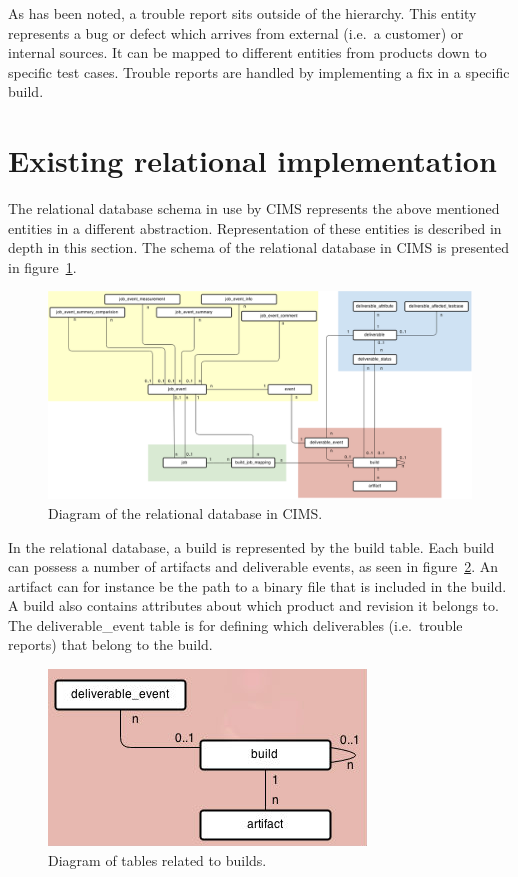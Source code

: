 As has been noted, a trouble report sits outside of the hierarchy. This entity represents a bug or defect which arrives from external (i.e.\ a customer) or internal sources. It can be mapped to different entities from products down to specific test cases. Trouble reports are handled by implementing a fix in a specific build.

\section{Existing relational implementation}
The relational database schema in use by CIMS represents the above mentioned entities in a different abstraction. Representation of these entities is described in depth in this section. 
The schema of the relational database in CIMS is presented in figure~\ref{fig:sql}.

\begin{figure}[h!]
\centering
\includegraphics[scale=0.5, angle=90]{figure/sql.png}
\caption{Diagram of the relational database in CIMS.}
\label{fig:sql}
\end{figure}
\clearpage



In the relational database, a build is represented by the build table. Each build can possess a number of artifacts and deliverable events, as seen in figure~\ref{fig:build}. An artifact can for instance be the path to a binary file that is included in the build. A build also contains attributes about which product and revision it belongs to. The deliverable\_event table is for defining which deliverables (i.e.\ trouble reports) that belong to the build.
\begin{figure}[h!]
\centering
\includegraphics[scale=0.5]{figure/build.jpg}
\caption{Diagram of tables related to builds.}
\label{fig:build}
\end{figure}

